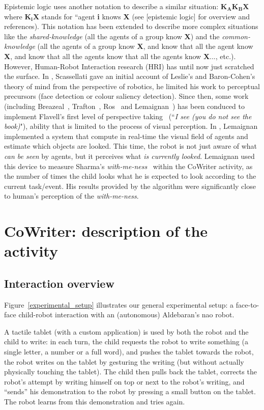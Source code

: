\documentclass[10pt,a4paper,twocolumn]{article}
\begin{document}
Epistemic logic uses another notation to describe a similar situation: $\textbf{K}_{\textbf{A}}\textbf{K}_{\textbf{B}}\textbf{X}$ where $\textbf{K}_{\textbf{i}}\textbf{X}$ stands for ``agent \textbf{i} knows \textbf{X} (see [epistemic logic] for overview and references). This notation has been extended to describe more complex situations like the \textit{shared-knowledge} (all the agents of a group know \textbf{X}) and the \textit{common-knowledge} (all the agents of a group know \textbf{X}, and know that all the agent know \textbf{X}, and know that all the agents know that all the agents know \textbf{X}..., etc.). 
However, Human-Robot Interaction research (HRI) has until now just scratched the surface. In \cite{scassellati2002theory}, Scassellati gave an initial account of Leslie's and Baron-Cohen's theory of mind from the perspective of robotics, he limited his work to perceptual precursors (face detection or colour saliency detection). Since then, some work (including Breazeal~\cite{breazeal2006using}, Trafton~\cite{Trafton2005}, Ros~\cite{Ros2010} and Lemaignan~\cite{lemaignan2012thesis}) has been conduced to implement Flavell's first level of perspective taking~\cite{flavell1977development} (``\textit{I see (you do not see the book)}"), ability that is limited to the process of visual perception.
In \cite{lemaignan2016realtime}, Lemaignan implemented a system that compute in real-time the visual field of agents and estimate which objects are looked. This time, the robot is not just aware of what \textit{can be seen} by agents, but it perceives what \textit{is currently looked}. Lemaignan used this device to measure Sharma's \textit{with-me-ness}~\cite{sharma2014me} within the CoWriter activity, as the number of times the child looks what he is expected to look according to the current task/event. His results provided by the algorithm were significantly close to human's perception of the \textit{with-me-ness}.


\section{CoWriter: description of the activity}
\subsection{Interaction overview}
Figure~\ref{experimental_setup} illustrates our general experimental setup: a
face-to-face child-robot interaction with an (autonomous) Aldebaran's {\sc nao}
robot.

A tactile tablet (with a custom application) is used by both the robot and the
child to write: in each turn, the child requests the robot to write
something (a single letter, a number or a full word), and pushes the tablet
towards the robot, the robot writes on the tablet by gesturing the writing (but
without actually physically touching the tablet). The child then pulls back the
tablet, corrects the robot's attempt by writing himself on top or next to
the robot's writing, and ``sends'' his
demonstration to the robot by pressing a small button on the tablet. The robot
learns from this demonstration and tries again.
\end{document}
